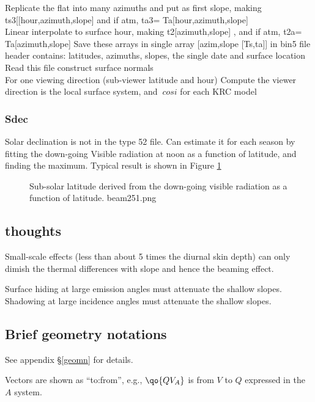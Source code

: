 \documentclass{article}
\begin{document}
\qi Replicate the flat into many azimuths and put as first slope, making ts3[[hour,azimuth,slope]
\qiii and if atm, ta3= Ta[hour,azimuth,slope]
\\ Linear interpolate to surface hour, making
\qi t2[azimuth,slope] ,  and if atm, t2a= Ta[azimuth,slope]
\qi Save these arrays in single array [azim,slope [Ts,ta]] in bin5 file
\qii header contains:  latitudes, azimuths, slopes, the single date and surface location
\\ Read this file
\qi construct surface normals
\\ For one viewing direction (sub-viewer latitude and hour)
\qi Compute the viewer direction is the local surface system, and $\ cos i$  for each KRC model 

\subsubsection{Sdec}
Solar declination is not in the type 52 file. Can estimate it for each season by fitting the down-going Visible radiation at noon as a function of latitude, and finding the maximum. Typical result is shown in Figure 
\ref{beam251}
\begin{figure}[!ht] 
\caption[Estimated sub-Solar Latitude]{Sub-solar latitude derived from the down-going visible radiation as a function of latitude.
\label{beam251}  beam251.png }
\end{figure} 


\subsection{thoughts}

 Small-scale effects (less than about 5 times the diurnal skin depth) can only dimish the thermal differences with slope and hence the beaming effect.

Surface hiding at large emission angles must attenuate the shallow slopes. 
Shadowing at large incidence angles must attenuate the shallow slopes.

\subsection{Brief geometry notations}

See appendix \S \ref{geomn} for details.

Vectors are shown as ``to:from'', e.g., $\qo{QV_A}$  is from $V$ to $Q$ expressed in the $A$ system.
\end{document}
